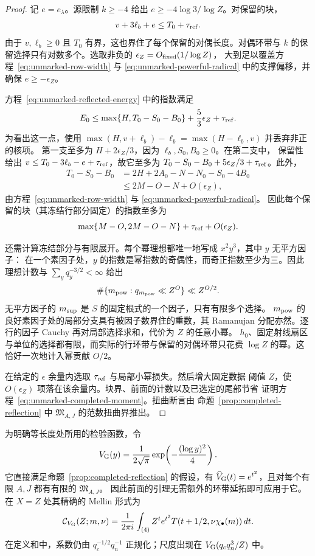 \documentclass[11pt,a4paper]{article}
\numberwithin{equation}{section}
\numberwithin{figure}{section}
\theoremstyle{definition}
\theoremstyle{remark}
\begin{document}
\begin{proof}
记 $e=e_\lambda$。源限制 $k\ge-4$ 给出 $e\ge-4\log 3/\log Z$。对保留的块，
\[
 v+3\ell_b+e\le T_0+\tau_{\rm ref}.
\]
由于 $v,\ell_b\ge0$ 且 $T_0$ 有界，这也界住了每个保留的对偶长度。对偶环带与 $k$
的保留选择只有对数多个。选取非负的 $\epsilon_Z=O_{\rm fixed}(1/\log Z)$，
大到足以覆盖方程~\eqref{eq:unmarked-row-width} 与
\eqref{eq:unmarked-powerful-radical} 中的支撑偏移，并确保 $e\ge-\epsilon_Z$。

方程~\eqref{eq:unmarked-reflected-energy} 中的指数满足
\[
 E_0\le\max\{H,T_0-S_0-B_0\}+\frac53\epsilon_Z+\tau_{\rm ref}.
\]
为看出这一点，使用 $\max(H,v+\ell_b)-\ell_b=\max(H-\ell_b,v)$ 并丢弃非正的核项。
第一支至多为 $H+2\epsilon_Z/3$，因为 $\ell_b,S_0,B_0\ge0$。在第二支中，
保留性给出 $v\le T_0-3\ell_b-e+\tau_{\rm ref}$，故它至多为
$T_0-S_0-B_0+5\epsilon_Z/3+\tau_{\rm ref}$。此外，
\[
 \begin{split}
 T_0-S_0-B_0
 &=2H+2A_0-N-N_0-S_0-4B_0\\
 &\le 2M-O-N+O(\epsilon_Z),
 \end{split}
\]
由方程~\eqref{eq:unmarked-row-width} 与 \eqref{eq:unmarked-powerful-radical}。
因此每个保留的块（其冻结行部分固定）的指数至多为
\[
 \max\{M-O,2M-O-N\}+\tau_{\rm ref}+O(\epsilon_Z).
\]

还需计算冻结部分与有限展开。每个幂理想都唯一地写成 $x^2y^3$，其中 $y$ 无平方因子：
在一个素因子处，$y$ 的指数是幂指数的奇偶性，而奇正指数至少为三。因此理想计数与
$\sum_yq_y^{-3/2}<\infty$ 给出
\[
 \#\{m_{\rm pow}:q_{m_{\rm pow}}\ll Z^O\}\ll Z^{O/2}.
\]
无平方因子的 $m_{\rm sup}$ 是 $S$ 的固定根式的一个因子，只有有限多个选择。
$m_{\rm pow}$ 的良好素因子处的局部分支具有被因子数界住的重数，其 Ramanujan
分配亦然。逐行的因子 Cauchy 再对局部选择求和，代价为 $Z$ 的任意小幂。
$h_0$、固定射线扇区与单位的选择都有限，而实际的行环带与保留的对偶环带只花费
$\log Z$ 的幂。这恰好一次地计入幂贡献 $O/2$。

在给定的 $\epsilon$ 余量内选取 $\tau_{\rm ref}$ 与局部小幂损失。然后增大固定数据
阈值 $Z$，使 $O(\epsilon_Z)$ 项落在该余量内。块界、前面的计数以及已选定的尾部节省
证明方程~\eqref{eq:unmarked-completed-moment}。扭曲断言由
命题~\ref{prop:completed-reflection} 中 $\mathfrak M_{A,J}$ 的范数扭曲界推出。
\end{proof}

为明确等长度处所用的检验函数，令
\[
 V_{\rm G}(y)=\frac1{2\sqrt\pi}
           \exp\!\left(-\frac{(\log y)^2}{4}\right).
\]
它直接满足命题~\ref{prop:completed-reflection} 的假设，有
$\widehat V_{\rm G}(t)=e^{t^2}$，且对每个有限 $A,J$ 都有有限的 $\mathfrak M_{A,J}$。
因此前面的引理无需额外的环带延拓即可应用于它。在 $X=Z$ 处其精确的 Mellin 形式为
\[
 \mathcal C_{V_{\rm G}}(Z;m,\nu)=\frac1{2\pi i}\int_{(4)}
       Z^t e^{t^2}T(t+1/2,\nu\chi_\bullet(m))\,dt.
\]
在定义和中，系数仍由 $q_c^{-1/2}q_n^{-1}$ 正规化；尺度出现在
$V_{\rm G}(q_cq_n^3/Z)$ 中。
\end{document}
